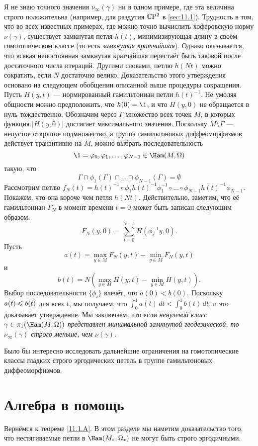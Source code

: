 Я не знаю точного значения $\nu_\infty (\gamma)$ ни в одном примере,
где эта величина строго положительна (например, для раздутия $\mathbb{C}\mathrm{P}^2$ в
\ref{sec:11.1}).
Трудность в том, что во всех известных примерах, где можно точно
вычислить хоферовскую норму $\nu(\gamma)$, существует замкнутая петля
$h(t)$, минимизирующая длину в своём гомотопическом классе (то есть
\emph{замкнутая кратчайшая}).
Однако оказывается, что всякая непостоянная замкнутая кратчайшая
перестаёт быть таковой после достаточного числа итераций.
Другими словами, петлю $h(Nt)$ можно сократить, если $N$ достаточно велико.
Доказательство этого утверждения основано на следующем обобщении
описанной выше процедуры сокращения.
Пусть $H(y, t)$ — нормированный гамильтониан петли $h(t)^{-1}$.
Не умоляя общности можно предположить, что $h(0) = \1$, и что $H(y,0)$
не обращается в нуль тождественно.
Обозначим через $\Gamma$ множество всех точек $M$, в которых функция
$|H(y, 0)|$ достигает максимального значения.
Поскольку $M \setminus \Gamma$ — непустое открытое подмножество, а
группа гамильтоновых диффеоморфизмов действует транзитивно на $M$,
можно выбрать последовательность
\[\1=\phi_0,\phi_1,\dots,\phi_{N-1}\in\Ham(M,\Omega)\]
такую, что 
\[\Gamma\cap\phi_1(\Gamma)\cap\dots\cap\phi_{N-1}(\Gamma)=\emptyset\]
Рассмотрим петлю $f_N(t) = h(t)^{-1} \circ \phi_1h(t)^{-1}\phi_1^{-1}
\circ \dots \circ \phi_{N-1}h(t)^{-1}\phi_{N-1}$.
Покажем, что она короче чем петля $h(Nt)$.
Действительно, заметим, что её гамильтониан $F_N$ в момент времени $t
= 0$ может быть записан следующим образом:
\[F_N(y,0) = \sum_{i=0}^{N-1} H(\phi_i^{-1}y, 0).\]
Пусть
\[a(t)
=
\max_{y\in M} F_N(y, t) - \min_{y\in M}  F_N(y, t)
\]
и
\[b(t)
=
N(\max_{y\in M} H(y, t) - \min_{y\in M}  H(y, t)).
\]
Выбор последовательности $\{\phi_i\}$ влечёт, что $a(0) < b(0)$.
Поскольку $a(t) \z\le b(t)$ для всех $t$, мы получаем, что
$\int_0^1a(t)\,dt < \int_0^1 b(t)\,dt$, и это доказывает утверждение.
Мы заключаем, что если \textit{ненулевой класс $\gamma\in
  \pi_1(\Ham(M, \Omega))$ представлен минимальной замкнутой
  геодезической, то $\nu_\infty (\gamma)$ строго меньше, чем
  $\nu(\gamma)$.}

Было бы интересно исследовать дальнейшие ограничения на гомотопические
классы гладких строго эргодических петель в группе гамильтоновых
диффеоморфизмов. 

\section{Алгебра в помощь}

Вернёмся к теореме \ref{11.1.A}.
В этом разделе мы наметим доказательство того, что нестягиваемые петли
в $\Ham(M_\ast, \Omega_\ast)$ не могут быть строго эргодичными.

